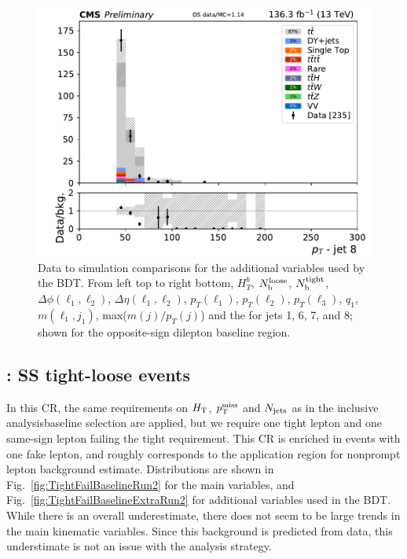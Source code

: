 \begin{figure}[!htb]
\includegraphics[width=0.32\linewidth]{figs/ftan/cr/run2_os_ptj8_in.pdf}
\caption{ Data to simulation comparisons for the additional variables used by the BDT. From left top to right bottom,
$H_T^b$, $N_\mathrm{b}^\text{loose}$, $N_\mathrm{b}^\text{tight}$, $\Delta \phi(\ell_{1},\ell_2)$, 
$\Delta \eta(\ell_{1},\ell_{2})$, $p_T(\ell_1)$, $p_T(\ell_2)$, $p_T(\ell_3)$,
    $q_1$, $m(\ell_1,j_1)$, max($m(j)/p_T(j)$) and the \pt for jets 1, 6, 7, and 8;
shown for the opposite-sign dilepton baseline region. }
\label{fig:OSBaselineExtraRun2}
\end{figure}

\FloatBarrier
  
\subsection{\smft: SS tight-loose events}\label{sec:TLCR}

In this CR, the same requirements on $H_{\mathrm{T}}$, $p_{\mathrm{T}}^\text{miss}$
and $N_\text{jets}$ as in the inclusive \smft analysisbaseline selection are applied,
but we require one tight lepton and
one same-sign lepton failing the tight requirement. This CR is
enriched in events with one fake lepton, and roughly corresponds to the application region for 
nonprompt lepton background estimate.
Distributions are shown in Fig.~\ref{fig:TightFailBaselineRun2} for the main variables, 
and Fig.~\ref{fig:TightFailBaselineExtraRun2} for additional variables used in the BDT. 
While there is an overall underestimate, there does not seem to be large trends in the main
kinematic variables. Since this background is predicted from data, this understimate is
not an issue with the analysis strategy.

